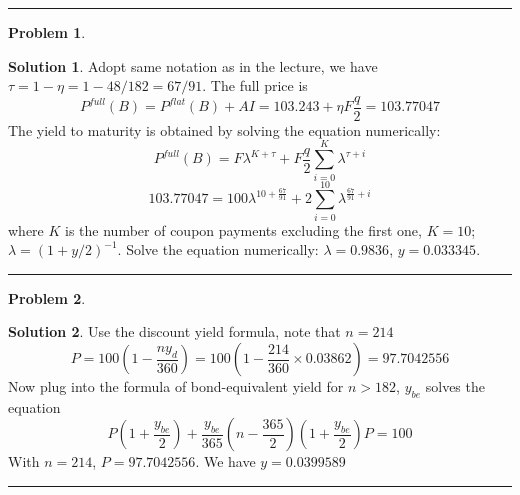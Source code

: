 \documentclass[a4paper, 10pt]{article}
\theoremstyle{definition}
\newtheorem{problem}{Problem}
\theoremstyle{hSol}
\newtheorem*{solution}{Solution}
\begin{document}
\noindent\rule{16cm}{0.4pt}

\begin{problem} 
\end{problem}
\begin{solution} Adopt same notation as in the lecture, we have $\tau=1-\eta = 1-48/182 =67/91$. The full price is
$$
P^{full}(B) = P^{flat}(B) + AI = 103.243 + \eta F\frac{q}{2} = 103.77047
$$
The yield to maturity is obtained by solving the equation numerically:
$$
P^{full}(B) = F \lambda^{K+\tau} + F\frac{q}{2}\sum_{i=0}^{K} \lambda^{\tau + i}
$$
$$
103.77047 = 100 \lambda^{10+\tfrac{67}{91}} + 2\sum_{i=0}^{10} \lambda^{\tfrac{67}{91} + i}
$$
where $K$ is the number of coupon payments excluding the first one, $K=10$; $\lambda=(1+y/2)^{-1}$. Solve the equation numerically: $\lambda=0.9836$, $y=0.033345$.

\end{solution}
\noindent\rule{16cm}{0.4pt}

\begin{problem} 
\end{problem}
\begin{solution} Use the discount yield formula, note that $n=214$
$$
P = 100\left(1-\frac{ny_d}{360}\right) =100\left(1-\frac{214}{360}\times 0.03862\right) = 97.7042556
$$
Now plug into the formula of bond-equivalent yield for $n>182$, $y_{be}$ solves the equation
$$
P\left(1+\frac{y_{be}}{2}\right) + \frac{y_{be}}{365}\left(n-\frac{365}{2}\right)\left(1+\frac{y_{be}}{2}\right)P = 100
$$
With $n=214$, $P=97.7042556$. We have $y=0.0399589$

\end{solution}

\noindent\rule{16cm}{0.4pt}
\end{document}
